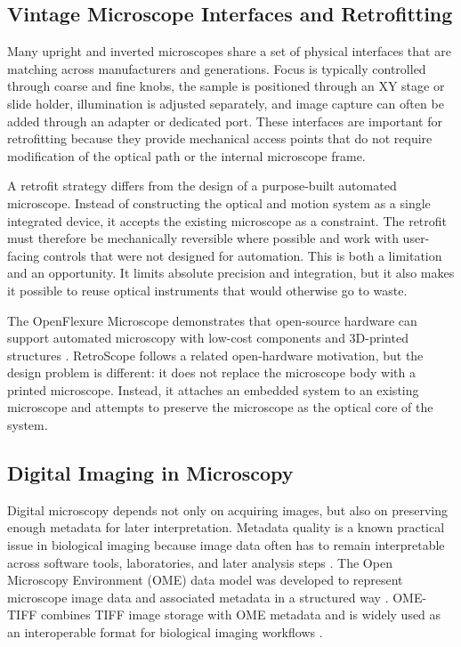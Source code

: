 \subsection{Vintage Microscope Interfaces and Retrofitting}

Many upright and inverted microscopes share a set of physical interfaces that are matching across manufacturers and generations. Focus is typically controlled through coarse and fine knobs, the sample is positioned through an XY stage or slide holder, illumination is adjusted separately, and image capture can often be added through an adapter or dedicated port. These interfaces are important for retrofitting because they provide mechanical access points that do not require modification of the optical path or the internal microscope frame.

A retrofit strategy differs from the design of a purpose-built automated microscope. Instead of constructing the optical and motion system as a single integrated device, it accepts the existing microscope as a constraint. The retrofit must therefore be mechanically reversible where possible and work with user-facing controls that were not designed for automation. This is both a limitation and an opportunity. It limits absolute precision and integration, but it also makes it possible to reuse optical instruments that would otherwise go to waste.

The OpenFlexure Microscope demonstrates that open-source hardware can support automated microscopy with low-cost components and 3D-printed structures \cite{collins2020openflexure}. RetroScope follows a related open-hardware motivation, but the design problem is different: it does not replace the microscope body with a printed microscope. Instead, it attaches an embedded system to an existing microscope and attempts to preserve the microscope as the optical core of the system.

\subsection{Digital Imaging in Microscopy}

Digital microscopy depends not only on acquiring images, but also on preserving enough metadata for later interpretation. Metadata quality is a known practical issue in biological imaging because image data often has to remain interpretable across software tools, laboratories, and later analysis steps \cite{linkert2010metadata}. The Open Microscopy Environment (OME) data model was developed to represent microscope image data and associated metadata in a structured way \cite{goldberg2005ome}. OME-TIFF combines TIFF image storage with OME metadata and is widely used as an interoperable format for biological imaging workflows \cite{omeTiffDocs}.

